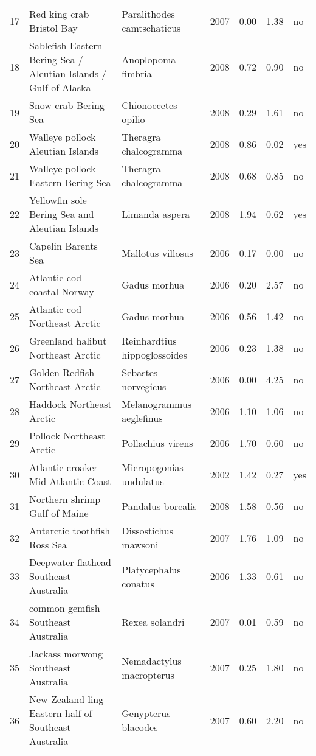\begin{table}[ht]
\begin{center}
\begin{tabular}{rllrrrl}
  17 & Red king crab Bristol Bay & Paralithodes camtschaticus & 2007 & 0.00 & 1.38 & no \\
  18 & Sablefish Eastern Bering Sea / Aleutian Islands / Gulf of Alaska & Anoplopoma fimbria & 2008 & 0.72 & 0.90 & no \\
  19 & Snow crab Bering Sea & Chionoecetes opilio & 2008 & 0.29 & 1.61 & no \\
  20 & Walleye pollock Aleutian Islands & Theragra chalcogramma & 2008 & 0.86 & 0.02 & yes \\
  21 & Walleye pollock Eastern Bering Sea & Theragra chalcogramma & 2008 & 0.68 & 0.85 & no \\
  22 & Yellowfin sole Bering Sea and Aleutian Islands & Limanda aspera & 2008 & 1.94 & 0.62 & yes \\
  23 & Capelin Barents Sea & Mallotus villosus & 2006 & 0.17 & 0.00 & no \\
  24 & Atlantic cod coastal Norway & Gadus morhua & 2006 & 0.20 & 2.57 & no \\
  25 & Atlantic cod Northeast Arctic & Gadus morhua & 2006 & 0.56 & 1.42 & no \\
  26 & Greenland halibut Northeast Arctic & Reinhardtius hippoglossoides & 2006 & 0.23 & 1.38 & no \\
  27 & Golden Redfish Northeast Arctic & Sebastes norvegicus & 2006 & 0.00 & 4.25 & no \\
  28 & Haddock Northeast Arctic & Melanogrammus aeglefinus & 2006 & 1.10 & 1.06 & no \\
  29 & Pollock Northeast Arctic & Pollachius virens & 2006 & 1.70 & 0.60 & no \\
  30 & Atlantic croaker Mid-Atlantic Coast & Micropogonias undulatus & 2002 & 1.42 & 0.27 & yes \\
  31 & Northern shrimp Gulf of Maine & Pandalus borealis & 2008 & 1.58 & 0.56 & no \\
  32 & Antarctic toothfish Ross Sea & Dissostichus mawsoni & 2007 & 1.76 & 1.09 & no \\
  33 & Deepwater flathead Southeast Australia & Platycephalus conatus & 2006 & 1.33 & 0.61 & no \\
  34 & common gemfish Southeast Australia & Rexea solandri & 2007 & 0.01 & 0.59 & no \\
  35 & Jackass morwong Southeast Australia & Nemadactylus macropterus & 2007 & 0.25 & 1.80 & no \\
  36 & New Zealand ling Eastern half of Southeast Australia & Genypterus blacodes & 2007 & 0.60 & 2.20 & no \\

\end{tabular}
\end{center}
\end{table}

